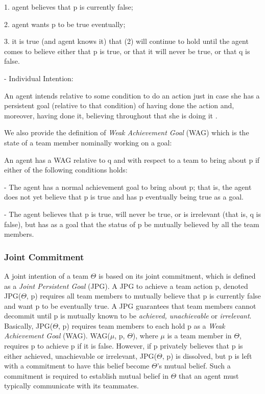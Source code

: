 \documentclass[11pt]{article}
\begin{document}
1. agent believes that p is currently false;

2. agent wants p to be true eventually;

3. it is true (and agent knows it) that (2) will continue to hold until the
agent comes to believe either that p is true, or that it will never be true, or
that q is false.

- Individual Intention:

An agent intends relative to some condition to do an action just in case she has
a persistent goal (relative to that condition) of having done the action and,
moreover, having done it, believing throughout that she is doing it
\cite{cohen:teamwork}.


We also provide the definition of \textit{Weak Achievement Goal} (WAG) which is
the state of a team member nominally working on a goal:

An agent has a WAG relative to q and with respect to a team to bring about p if
either of the following conditions holds:

- The agent has a normal achievement goal to bring about p; that is, the agent
does not yet believe that p is true and has p eventually being true as a goal.

- The agent believes that p is true, will never be true, or is irrelevant (that
is, q is false), but has as a goal that the status of p be mutually believed by
all the team members.

\subsubsection{Joint Commitment}
\label{sec:jpg}

A joint intention of a team $\Theta$ is based on its joint commitment, which is
defined as a \textit{Joint Persistent Goal} (JPG). A JPG to achieve a team
action p, denoted JPG($\Theta$, p) requires all team members to mutually believe
that p is currently false and want p to be eventually true. A JPG guarantees
that team members cannot decommit until p is mutually known to be
\textit{achieved, unachievable} or \textit{irrelevant}. Basically, JPG($\Theta$,
p) requires team members to each hold p as a \textit{Weak Achievement Goal}
(WAG). WAG($\mu$, p, $\Theta$), where $\mu$ is a team member in $\Theta$,
requires p to achieve p if it is false. However, if p privately believes that p
is either achieved, unachievable or irrelevant, JPG($\Theta$, p) is dissolved,
but p is left with a commitment to have this belief become $\Theta$'s mutual
belief. Such a commitment is required to establish mutual belief in $\Theta$
that an agent must typically communicate with its teammates.
\end{document}
